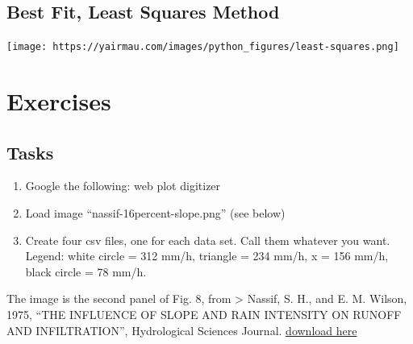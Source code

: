 \documentclass[
  letterpaper,
  DIV=11,
  numbers=noendperiod]{scrreprt}
\providecommand{\tightlist}{%
  \setlength{\itemsep}{0pt}\setlength{\parskip}{0pt}}\usepackage{longtable,booktabs,array}
\begin{document}
\hypertarget{best-fit-least-squares-method}{%
\section{Best Fit, Least Squares
Method}\label{best-fit-least-squares-method}}

\texttt{[image: https://yairmau.com/images/python\_figures/least-squares.png]}

\hypertarget{exercises-5}{%
\chapter{Exercises}\label{exercises-5}}

\hypertarget{tasks}{%
\section{Tasks}\label{tasks}}

\begin{enumerate}
\def\labelenumi{\arabic{enumi}.}
\tightlist
\item
  Google the following: web plot digitizer
\item
  Load image ``nassif-16percent-slope.png'' (see below)
\item
  Create four csv files, one for each data set. Call them whatever you
  want. Legend: white circle = 312 mm/h, triangle = 234 mm/h, x = 156
  mm/h, black circle = 78 mm/h.
\end{enumerate}

The image is the second panel of Fig. 8, from \textgreater{} Nassif, S.
H., and E. M. Wilson, 1975, ``THE INFLUENCE OF SLOPE AND RAIN INTENSITY
ON RUNOFF AND INFILTRATION'', Hydrological Sciences Journal.
\href{https://yairmau.com/archive/hydrology/nassif-1975-THE-INFLUENCE-OF-SLOPE-AND-RAIN-INTENSITY-ON-RUNOFF-AND-INFILTRATION.pdf}{download
here}
\end{document}
